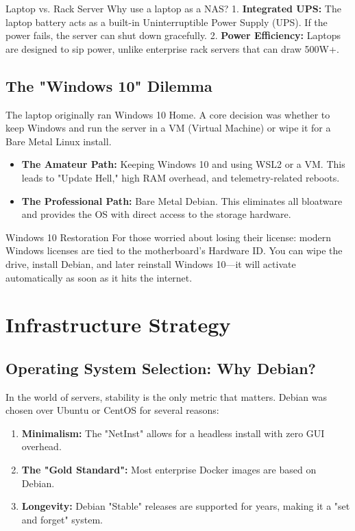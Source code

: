 \documentclass[12pt,a4paper,oneside]{book}
\begin{document}
\begin{conceptbox}{Laptop vs. Rack Server}
Why use a laptop as a NAS? 
1. \textbf{Integrated UPS:} The laptop battery acts as a built-in Uninterruptible Power Supply (UPS). If the power fails, the server can shut down gracefully.
2. \textbf{Power Efficiency:} Laptops are designed to sip power, unlike enterprise rack servers that can draw 500W+.
\end{conceptbox}

\section{The "Windows 10" Dilemma}
The laptop originally ran Windows 10 Home. A core decision was whether to keep Windows and run the server in a VM (Virtual Machine) or wipe it for a Bare Metal Linux install.

\begin{itemize}
    \item \textbf{The Amateur Path:} Keeping Windows 10 and using WSL2 or a VM. This leads to "Update Hell," high RAM overhead, and telemetry-related reboots.
    \item \textbf{The Professional Path:} Bare Metal Debian. This eliminates all bloatware and provides the OS with direct access to the storage hardware.
\end{itemize}

\begin{techwarning}{Windows 10 Restoration}
For those worried about losing their license: modern Windows licenses are tied to the motherboard's Hardware ID. You can wipe the drive, install Debian, and later reinstall Windows 10—it will activate automatically as soon as it hits the internet.
\end{techwarning}

\chapter{Infrastructure Strategy}

\section{Operating System Selection: Why Debian?}
In the world of servers, stability is the only metric that matters. Debian was chosen over Ubuntu or CentOS for several reasons:
\begin{enumerate}
    \item \textbf{Minimalism:} The "NetInst" allows for a headless install with zero GUI overhead.
    \item \textbf{The "Gold Standard":} Most enterprise Docker images are based on Debian.
    \item \textbf{Longevity:} Debian "Stable" releases are supported for years, making it a "set and forget" system.
\end{enumerate}
\end{document}
